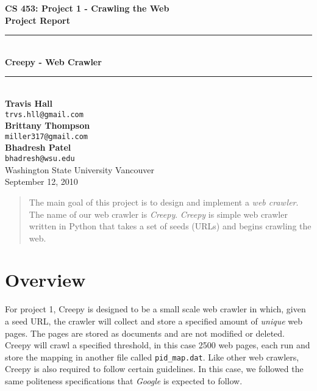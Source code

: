 \documentclass[letterpaper,11pt,twoside]{article}
\begin{document}
\begin{titlepage}
   \begin{center}
       {\Large \textbf{CS 453: Project 1 - Crawling the Web}}\\[0.5cm]
       {\Large \textbf{Project Report}}\\[3.0cm]

       {\rule{\linewidth}{0.5mm}} \\[0.5cm]
       {\Huge \textbf{Creepy - Web Crawler}}\\[0.4cm] 
       {\rule{\linewidth}{0.5mm}} \\[2.0cm]

       \textbf{Travis Hall}\\
       \texttt{trvs.hll@gmail.com}\\[0.5cm]
       \textbf{Brittany Thompson}\\
       \texttt{miller317@gmail.com}\\[0.5cm]
       \textbf{Bhadresh Patel}\\
       \texttt{bhadresh@wsu.edu}\\[0.5cm]

       \vfill
       Washington State University Vancouver\\
       September 12, 2010
   \end{center}
\end{titlepage}

\begin{abstract}
The main goal of this project is to design and implement a \emph{web crawler}. The name of our web crawler is \emph{Creepy}. \emph{Creepy} is simple web crawler written in Python that takes a set of seeds (URLs) and begins crawling the web.
\end{abstract}

\section{Overview}
For project 1, Creepy is designed to be a small scale web crawler in which, given a seed URL, the crawler will collect and store a specified amount of \emph{unique} web pages. The pages are stored as documents and are not modified or deleted. Creepy will crawl a specified threshold, in this case 2500 web pages, each run and store the mapping in another file called \texttt{pid\_map.dat}. Like other web crawlers, Creepy is also required to follow certain guidelines. In this case, we followed the same politeness specifications that \emph{Google} is expected to follow. 
\end{document}
